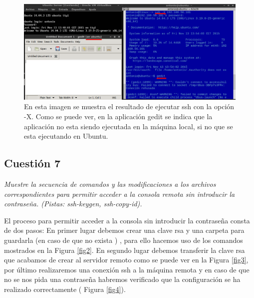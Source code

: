 \begin{figure}[H]
    \begin{center}
    \advance\leftskip-2.5cm
        \includegraphics[scale=0.5]{imagenes/img1}
        \caption{En esta imagen se muestra el resultado de ejecutar ssh con la opción -X. Como se puede ver, en la aplicación gedit se indica que la aplicación no esta siendo ejecutada en la máquina local, si no que se esta ejecutando en Ubuntu.}
        \label{fig1}
    \end{center}
\end{figure}





\subsection{Cuestión 7}
\textit{Muestre la secuencia de comandos y las modificaciones a los archivos correspondientes para permitir acceder a la consola remota sin introducir la contraseña. (Pistas: ssh-keygen, ssh-copy-id).}
\newline

El proceso para permitir acceder a la consola sin introducir la contraseña consta de dos pasos: En primer lugar debemos crear una clave rsa y una carpeta para guardarla (en caso de que no exista ) , para ello hacemos uso de los comandos mostrados en la Figura \ref{fig2}. En segundo lugar debemos transferir la clave rsa que acabamos de crear al servidor remoto como se puede ver en la Figura \ref{fig3}, por último realizaremos una conexión ssh a la máquina remota y en caso de que no se nos pida una contraseña habremos verificado que la configuración se ha realizado correctamente ( Figura \ref{fig4}). \cite{passssh}

